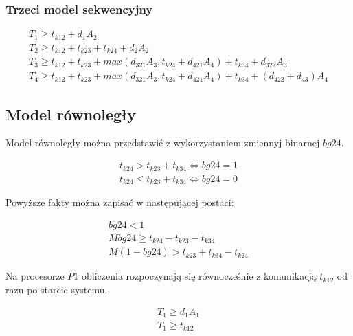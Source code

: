 \subsubsection{Trzeci model sekwencyjny}

\begin{equation} \label{eq:sek3}
\begin{array}{l}
T_{1} \geq t_{k12} + d_{1}A_{2} \\
T_{2} \geq t_{k12} + t_{k23} + t_{k24} + d_{2}A_{2} \\
T_{3} \geq t_{k12} + t_{k23} + max(d_{321}A_{3}, t_{k24} + d_{421}A_{4}) + t_{k34} + d_{322}A_{3} \\
T_{4} \geq t_{k12} + t_{k23} + max(d_{321}A_{3}, t_{k24} + d_{421}A_{4}) + t_{k34} + (d_{422} + d_{43})A_{4}
\end{array}
\end{equation}

\subsection{Model równoległy}

Model równoległy można przedstawić z wykorzystaniem zmiennyj binarnej $bg24$.

\begin{equation} \label{eq:bg24}
\begin{array}{l}
t_{k24} > t_{k23} + t_{k34} \iff bg24 = 1 \\
t_{k24} \leq t_{k23} + t_{k34} \iff bg24 = 0
\end{array}
\end{equation}

Powyższe fakty można zapisać w następującej postaci:

\begin{equation}
\begin{array}{l}
bg24 < 1 \\
Mbg24 \geq t_{k24} - t_{k23} - t_{k34} \\
M(1 - bg24) > t_{k23} + t_{k34} - t_{k24}
\end{array}
\end{equation}

Na procesorze $P1$ obliczenia rozpoczynają się równocześnie z komunikacją $t_{k12}$ od razu po starcie systemu.

\begin{equation}
\begin{array}{l}
T_{1} \geq d_{1}A_{1} \\
T_{1} \geq t_{k12}
\end{array}
\end{equation}

